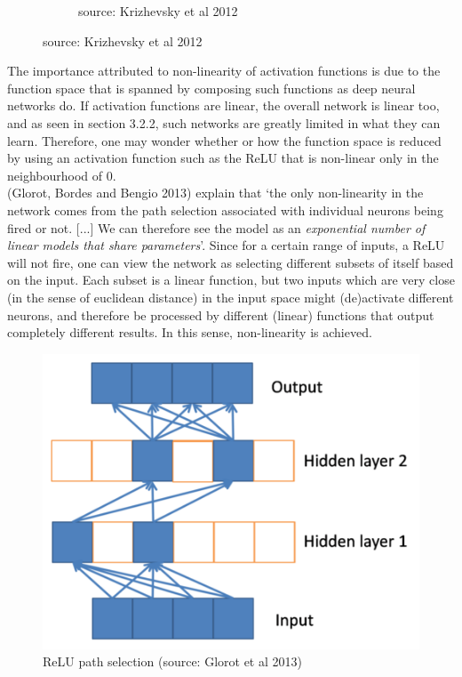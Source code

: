\documentclass[a4paper,11pt]{article}
\begin{document}
\begin{figure}
\begin{minipage}[b]{\textwidth}
\begin{subfigure}{.5\textwidth}
        \caption{source: Krizhevsky et al 2012}\label{fig:2b}
      \end{subfigure} \par \vspace*{20pt} %
    \end{minipage}%
    \label{f24}
\end{figure}

The importance attributed to non-linearity of activation functions is due to the function space that is spanned by composing such functions as deep neural networks do. If activation functions are linear, the overall network is linear too, and as seen in section 3.2.2, such networks are greatly limited in what they can learn. Therefore, one may wonder whether or how the function space is reduced by using an activation function such as the ReLU that is non-linear only in the neighbourhood of $0$.  \\

(Glorot, Bordes and Bengio 2013) \cite{rectifier} explain that `the only non-linearity in the network comes from the path selection associated with individual neurons being fired or not. [...] We can therefore see the model as an \textit{exponential number of linear models that share parameters}'. Since for a certain range of inputs, a ReLU will not fire, one can view the network as selecting different subsets of itself based on the input. Each subset is a linear function, but two inputs which are very close (in the sense of euclidean distance) in the input space might (de)activate different neurons, and therefore be processed by different (linear) functions that output completely different results. In this sense, non-linearity is achieved. \\

\begin{figure}[h!]
	\centering
	\includegraphics[scale=0.4]{images/ReLU_path_selection.png}
	\caption{ReLU path selection (source: Glorot et al 2013)}
    \label{f25}
\end{figure}
\end{document}
